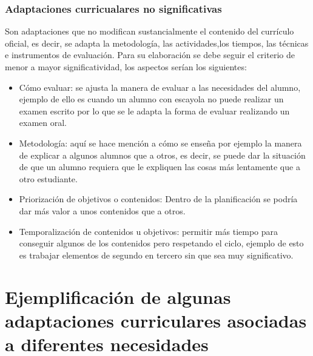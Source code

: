 \subsubsection{Adaptaciones curricualares no significativas}
Son adaptaciones que no modifican sustancialmente  el contenido del currículo oficial, es decir, se adapta la metodología,  las actividades,los tiempos, las técnicas e instrumentos de evaluación. Para su elaboración se debe  seguir el criterio de menor a mayor significatividad, los aspectos serían los siguientes:
\begin{itemize}
    \item Cómo evaluar: se ajusta la manera de evaluar a las necesidades del alumno, ejemplo de ello es cuando un alumno con escayola no puede realizar un examen escrito por lo que se le adapta la forma de evaluar realizando un examen oral.
    \item Metodología: aquí se hace mención a cómo se enseña por ejemplo la manera de explicar a algunos alumnos que a otros, es decir, se puede dar la situación de que un alumno requiera que le expliquen las cosas más lentamente que a otro estudiante.
    \item Priorización de objetivos o contenidos: Dentro de la planificación se podría dar más valor a unos contenidos que a otros.
    \item Temporalización de contenidos u objetivos: permitir más tiempo para conseguir algunos de los contenidos pero respetando el ciclo, ejemplo de esto es trabajar elementos de segundo en tercero sin que sea muy significativo.
\end{itemize}

\section{Ejemplificación de algunas adaptaciones curriculares asociadas a diferentes necesidades }

